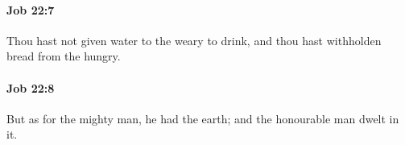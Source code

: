 		\paragraph{Job 22:7} %
			\label{JOB-22-7}

			Thou hast not given water to the weary to drink, and thou hast withholden bread from the hungry.


		\paragraph{Job 22:8} %
			\label{JOB-22-8}

			But as for the mighty man, he had the earth; and the honourable man dwelt in it.


